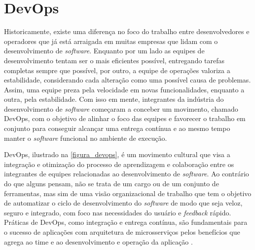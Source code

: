 


\section{DevOps}

Historicamente, existe uma diferença no foco do trabalho entre desenvolvedores e operadores que já está arraigada em muitas empresas que lidam com o desenvolvimento de \emph{software}. Enquanto por um lado as equipes de desenvolvimento tentam ser o mais eficientes possível, entregando tarefas completas sempre que possível, por outro, a equipe de operações valoriza a estabilidade, considerando cada alteração como uma possível causa de problemas. Assim, uma equipe preza pela velocidade em novas funcionalidades, enquanto a outra, pela estabilidade. Com isso em mente, integrantes da indústria do desenvolvimento de \emph{software} começaram a conceber um movimento, chamado DevOps, com o objetivo de alinhar o foco das equipes e favorecer o trabalho em conjunto para conseguir alcançar uma entrega contínua e ao mesmo tempo manter o \emph{software} funcional no ambiente de execução.

DevOps, ilustrado na \autoref{figura_devops}, é um movimento cultural que visa a integração e otimização do processo de aprendizagem e colaboração entre os integrantes de equipes relacionadas ao desenvolvimento de \emph{software}. Ao contrário do que alguns pensam, não se trata de um cargo ou de um conjunto de ferramentas, mas sim de uma visão organizacional de trabalho que tem o objetivo de automatizar o ciclo de desenvolvimento do \emph{software} de modo que seja veloz, seguro e integrado, com foco nas necessidades do usuário e \emph{feedback} rápido. Práticas de DevOps, como integração e entrega contínua, são fundamentais para o sucesso de aplicações com arquitetura de microsserviços pelos benefícios que agrega ao time e ao desenvolvimento e operação da aplicação \cite{gitlab-devops}.

